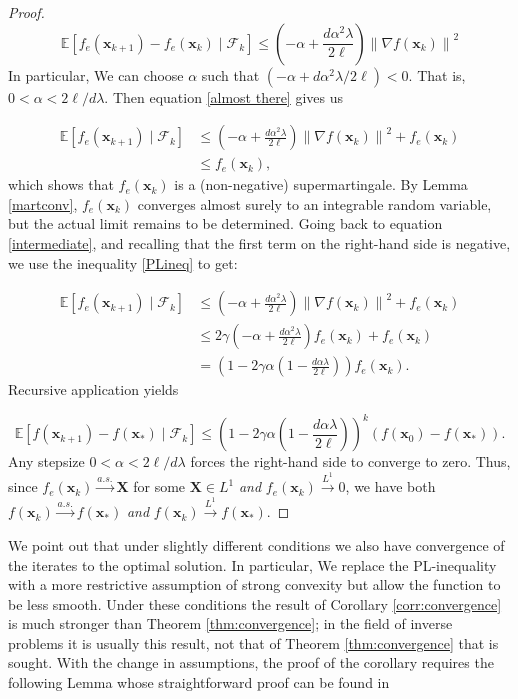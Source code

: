 \documentclass[11pt] {article}
\newcommand{\norm}[1]{\left\lVert#1\right\rVert}
\newcommand{\X}{\pmb{X}}
\newcommand{\x}{\pmb{x}}
\newcommand{\Expectation}{\mathbb{E}}
\newcommand{\convas}{\overset{a.s.}{\longrightarrow}}
\begin{document}
\begin{proof}
		
		\begin{equation} \label{almost there}
		\Expectation \left[f_e(\x_{k+1})-f_e(\x_k) \mid \mathcal{F}_k \right] \leq  \left(-\alpha +\frac{d\alpha^2\lambda}{2\ell}\right) \norm{\nabla f(\x_k)}^2 
		\end{equation}
	In particular, We can choose $\alpha$ such that $ \left(-\alpha +d\alpha^2\lambda/2\ell\right) <0$. That is, $0< \alpha < 2\ell/d\lambda$. Then equation \eqref{almost there} gives us
	
	\begin{align}\label{intermediate}
	\Expectation \left[f_e(\x_{k+1}) \mid \mathcal{F}_k\right] &\leq  \left(-\alpha +\frac{d\alpha^2\lambda}{2\ell}\right) \norm{\nabla f(\x_k)}^2 + f_e(\x_{k}) \\
\nonumber	&\leq f_e(\x_k),
	\end{align}
	which shows that $f_e(\x_k)$ is a (non-negative) supermartingale. By Lemma \ref{martconv}, $f_e(\x_k)$ converges almost surely to an integrable random variable, but the actual limit remains to be determined.  Going back to equation \eqref{intermediate}, and recalling that the first term on the right-hand side is negative, we use the inequality \eqref{PLineq} to get:
	
	\begin{align*}
		\Expectation \left[f_e(\x_{k+1}) \mid \mathcal{F}_k\right] &\leq  \left(-\alpha +\frac{d\alpha^2\lambda}{2\ell}\right) \norm{\nabla f(\x_k)}^2 + f_e(\x_{k}) \\
		&\leq 2\gamma  \left(-\alpha +\frac{d\alpha^2\lambda}{2\ell}\right)f_e(\x_k) + f_e(\x_{k})\\
		& = \left(1-2\gamma\alpha\left(1-\frac{d\alpha\lambda}{2\ell}\right)\right)f_e(\x_k).
	\end{align*}
%	
	Recursive application yields
	
	\begin{equation*}
		\Expectation \left[f(\x_{k+1})-f(\x_*) \mid \mathcal{F}_k \right]\leq  \left(1-2\gamma\alpha\left(1-\frac{d\alpha\lambda}{2\ell}\right)\right)^k \left(f(\x_0) - f(\x_*)\right).
	\end{equation*}
	Any stepsize $0 < \alpha < 2\ell/d\lambda$ forces the right-hand side to converge to zero. Thus, since $	f_e(\x_k) \convas \X$ for some $\X \in L^1$ \emph{and} $f_e(\x_k)\overset{L^1}{\to} 0$, we have both $f(\x_k) \convas f(\x_*)$ \emph{and} $f(\x_k) \overset{L^1}{\to} f(\x_*)$. 
\end{proof}
%
We point out that under slightly different conditions we also have convergence of the iterates to the optimal solution. In particular, We replace the PL-inequality with a more restrictive assumption of strong convexity but allow the function to be less smooth. Under these conditions the result of Corollary \ref{corr:convergence} is much stronger than Theorem \ref{thm:convergence}; in the field of inverse problems it is usually this result, not that of Theorem \ref{thm:convergence} that is sought. With the change in assumptions, the proof of the corollary requires the following Lemma whose straightforward proof can be found in \cite[pg. 56]{nesterov2013introductory}
\end{document}

